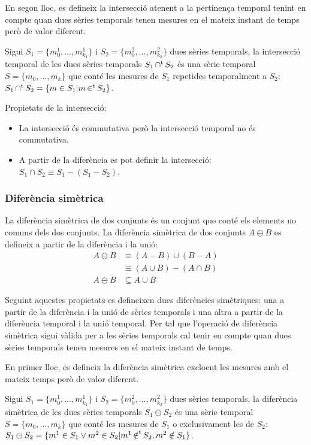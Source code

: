 En segon lloc, es defineix la intersecció atenent a la pertinença
temporal tenint en compte quan dues sèries temporals tenen mesures en
el mateix instant de temps però de valor diferent.
\begin{definition}
  Sigui $S_1=\{m_0^1, \dotsc, m_{k_1}^1\}$ i $S_2=\{m_0^2, \dotsc,
  m_{k_2}^2\}$ dues sèries temporals, la intersecció temporal de les
  dues sèries temporals $S_1 \operatorname*{\cap^t} S_2$ és una sèrie temporal
  $S=\{m_0, \dotsc, m_k\}$ que conté les mesures de $S_1$ repetides
  temporalment a $S_2$: $S_1 \operatorname*{\cap^t} S_2 = \{ m \in S_1 | m \operatorname*{\in^t} S_2
  \}$.
\end{definition}

Propietats de la intersecció:
\begin{itemize}
\item La intersecció és commutativa però la intersecció temporal no és
  commutativa.
\item A partir de la diferència es pot definir la intersecció: $S_1
  \cap S_2 \equiv S_1 - (S_1 - S_2)$.
\end{itemize}


\subsubsection{Diferència simètrica}

La diferència simètrica de dos conjunts és un conjunt que conté els
elements no comuns dels dos conjunts. La diferència simètrica de dos
conjunts $A \ominus B$ es defineix a partir de la diferència i la
unió:
\begin{align*}
A \ominus B  & \equiv (A-B)\cup(B-A)\\
             & \equiv (A\cup B)-(A\cap B)  \\
A \ominus B  & \subseteq A\cup B
\end{align*}

Seguint aquestes propietats es defineixen dues diferències
simètriques: una a partir de la diferència i la unió de sèries
temporals i una altra a partir de la diferència temporal i la unió
temporal.  Per tal que l'operació de diferència simètrica sigui vàlida
per a les sèries temporals cal tenir en compte quan dues sèries
temporals tenen mesures en el mateix instant de temps.

En primer lloc, es defineix la diferència simètrica excloent les
mesures amb el mateix temps però de valor diferent.
\begin{definition}
  Sigui $S_1=\{m_0^1, \dotsc, m_{k_1}^1\}$ i $S_2=\{m_0^2, \dotsc,
  m_{k_2}^2\}$ dues sèries temporals, la diferència simètrica de les
  dues sèries temporals $S_1 \ominus S_2$ és una sèrie temporal
  $S=\{m_0, \dotsc, m_k\}$ que conté les mesures de $S_1$ o
  exclusivament les de $S_2$: $S_1 \ominus S_2 = \{ m^1 \in S_1 \vee
  m^2 \in S_2 | m^1 \operatorname*{\notin^t} S_2, m^2 \notin S_1 \}$.
\end{definition}

